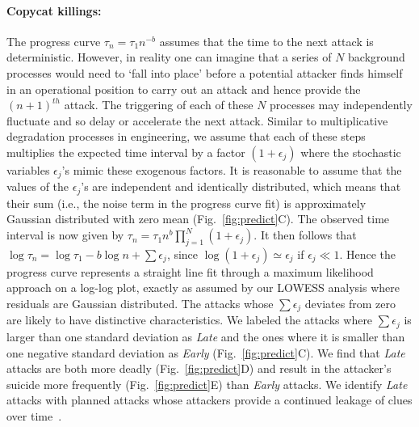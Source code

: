 \paragraph*{Copycat killings:}
The progress curve $\tau_n = \tau_1 n^{-b}$ assumes that the time to
the next attack is deterministic. However, in reality one can imagine
that a series of $N$ background processes would need to `fall into
place' before a potential attacker finds himself in an operational
position to carry out an attack and hence provide the $(n+1)^{th}$
attack. The triggering of each of these $N$ processes may
independently fluctuate and so delay or accelerate the next
attack. Similar to multiplicative degradation processes in
engineering, we assume that each of these steps multiplies the
expected time interval by a factor $(1+ \epsilon_j)$ where the
stochastic variables $\epsilon_j$'s mimic these exogenous factors. 
It is reasonable to assume that the values of the $\epsilon_j$'s are
independent and identically distributed, which means that their sum
(i.e., the noise term in the progress curve fit) is approximately
Gaussian distributed with zero mean (Fig.~\ref{fig:predict}C). The
observed time interval is now given by $\tau_n = \tau_1 n^b
\prod^N_{j=1}{(1+\epsilon_j)}$. 
It then follows that $\log{\tau_n} = \log{\tau_1} -b \log{n} +
\sum{\epsilon_j}$, since $\log{(1+\epsilon_j)} \simeq \epsilon_j$ if
$\epsilon_j \ll 1$. Hence the progress curve represents a straight
line fit through a maximum likelihood approach on a log-log plot,
exactly as assumed by our LOWESS analysis where residuals are Gaussian
distributed. The attacks whose $\sum{\epsilon_j}$ deviates from zero
are likely to have distinctive characteristics. We labeled the attacks
where $\sum{\epsilon_j}$ is larger than one standard deviation as
\textit{Late} and the ones where it is smaller than one negative
standard deviation as \textit{Early} (Fig.~\ref{fig:predict}C). We
find that \textit{Late} attacks are both more deadly
(Fig.~\ref{fig:predict}D) and result in the attacker's suicide more
frequently (Fig.~\ref{fig:predict}E) than \textit{Early} attacks. We
identify \textit{Late} attacks with planned attacks whose attackers
provide a continued leakage of clues over time~\cite{O2000}.


